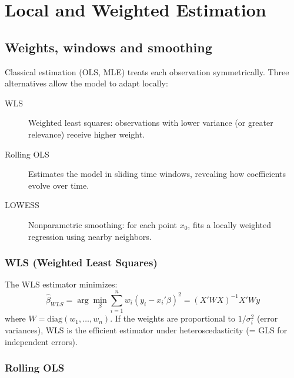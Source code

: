 \chapter{Local and Weighted Estimation}
\label{cap:local}

\section{Weights, windows and smoothing}

Classical estimation (OLS, MLE) treats each observation symmetrically.
Three alternatives allow the model to adapt locally:

\begin{description}
  \item[WLS] Weighted least squares: observations with lower variance
    (or greater relevance) receive higher weight.

  \item[Rolling OLS] Estimates the model in sliding time windows,
    revealing how coefficients evolve over time.

  \item[LOWESS] Nonparametric smoothing: for each point $x_0$, fits
    a locally weighted regression using nearby neighbors.
\end{description}

\subsection*{WLS (Weighted Least Squares)}

The WLS estimator minimizes:
\[
  \hat{\beta}_{WLS} = \arg\min_\beta \sum_{i=1}^n w_i (y_i - x_i'\beta)^2
  = (X'WX)^{-1} X'Wy
\]
where $W = \text{diag}(w_1, \ldots, w_n)$. If the weights are proportional to
$1/\sigma_i^2$ (error variances), WLS is the efficient estimator under
heteroscedasticity (= GLS for independent errors).

\subsection*{Rolling OLS}

